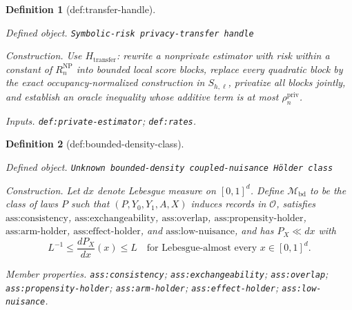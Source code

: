 \documentclass{article}
\newtheorem{definition}{Definition}
\begin{document}
\begin{definition}[def:transfer-handle]\label{def:transfer-handle}
\par\smallskip\noindent\emph{Defined object.} \texttt{Symbolic-\allowbreak{}risk privacy-\allowbreak{}transfer handle}
\par\smallskip\noindent\emph{Construction.} Use \(H_{\mathrm{transfer}}\): rewrite a nonprivate estimator with risk within a constant of \(R_n^{\mathrm{NP}}\) into bounded local score blocks, replace every quadratic block by the exact occupancy-normalized construction in \(S_{h,\ell}\), privatize all blocks jointly, and establish an oracle inequality whose additive term is at most \(\rho_n^{\mathrm{priv}}\).
\par\smallskip\noindent\emph{Inputs.} \texttt{def:\allowbreak{}private-\allowbreak{}estimator}; \texttt{def:\allowbreak{}rates}.
\end{definition}

\begin{definition}[def:bounded-density-class]\label{def:bounded-density-class}
\par\smallskip\noindent\emph{Defined object.} \texttt{Unknown bounded-\allowbreak{}density coupled-\allowbreak{}nuisance Hölder class}
\par\smallskip\noindent\emph{Construction.} Let \(dx\) denote Lebesgue measure on \([0,1]^d\).  Define \(\mathcal M_{\mathrm{bd}}\) to be the class of laws \(P\) such that \((P,Y_0,Y_1,A,X)\) induces records in \(\mathcal O\), satisfies \(\text{ass:consistency}\), \(\text{ass:exchangeability}\), \(\text{ass:overlap}\), \(\text{ass:propensity-holder}\), \(\text{ass:arm-holder}\), \(\text{ass:effect-holder}\), and \(\text{ass:low-nuisance}\), and has \(P_X\ll dx\) with
\[
 L^{-1}\le \frac{dP_X}{dx}(x)\le L
 \quad\text{for Lebesgue-almost every }x\in[0,1]^d.
\]
\par\smallskip\noindent\emph{Member properties.} \texttt{ass:\allowbreak{}consistency}; \texttt{ass:\allowbreak{}exchangeability}; \texttt{ass:\allowbreak{}overlap}; \texttt{ass:\allowbreak{}propensity-\allowbreak{}holder}; \texttt{ass:\allowbreak{}arm-\allowbreak{}holder}; \texttt{ass:\allowbreak{}effect-\allowbreak{}holder}; \texttt{ass:\allowbreak{}low-\allowbreak{}nuisance}.
\end{definition}
\end{document}
